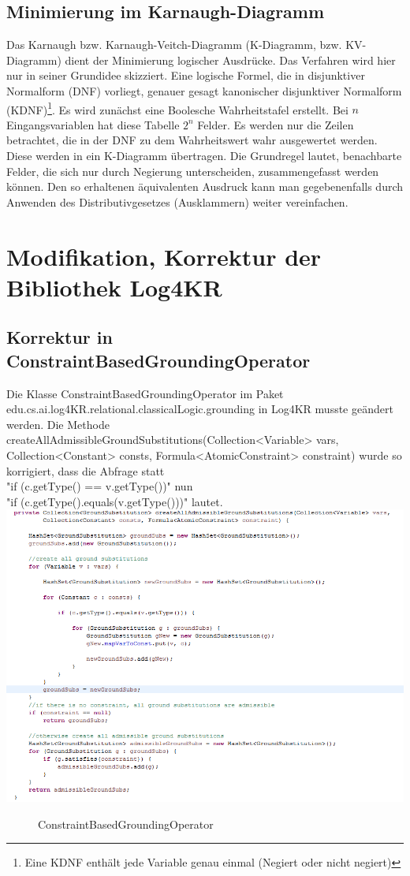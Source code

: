 \documentclass[a4paper, 11pt]{book}
\begin{document}
{	\section{Minimierung im Karnaugh-Diagramm}\label{Min_K_Dia} 
	Das Karnaugh bzw. Karnaugh-Veitch-Diagramm (K-Diagramm, bzw. KV-Diagramm) dient der Minimierung logischer Ausdrücke. Das Verfahren wird hier nur in seiner Grundidee skizziert. Eine logische Formel, die in disjunktiver Normalform (DNF) vorliegt, genauer gesagt kanonischer disjunktiver Normalform (KDNF)\footnote{Eine KDNF enthält jede Variable genau einmal (Negiert oder nicht negiert)}. Es wird zunächst eine Boolesche Wahrheitstafel erstellt. Bei $ n $ Eingangsvariablen hat diese Tabelle $ 2^{n} $ Felder. Es werden nur die Zeilen betrachtet, die in der DNF zu dem Wahrheitswert wahr ausgewertet werden. Diese werden in ein K-Diagramm übertragen.  Die Grundregel lautet, benachbarte Felder, die sich nur durch Negierung unterscheiden, zusammengefasst werden können. Den so erhaltenen äquivalenten Ausdruck kann man gegebenenfalls durch Anwenden des Distributivgesetzes (Ausklammern) weiter vereinfachen.
}
\chapter{Modifikation, Korrektur der Bibliothek Log4KR}
\section{Korrektur in ConstraintBasedGroundingOperator}
\label{sec:Korrektur1}
Die Klasse ConstraintBasedGroundingOperator im Paket edu.cs.ai.log4KR.relational.classicalLogic.grounding in Log4KR musste geändert werden. Die Methode createAllAdmissibleGroundSubstitutions(Collection<Variable> vars,
Collection<Constant> consts, Formula<AtomicConstraint> constraint) wurde so korrigiert, dass die Abfrage statt\\
 "{}if (c.getType() == v.getType())"{} 
nun \\
"{}if (c.getType().equals(v.getType()))"{} lautet.\\
\includegraphics[scale = 1.0]{Graphics/Aenderung_1}
\begin{figure}[h]
	\caption{ConstraintBasedGroundingOperator}
\end{figure}
\end{document}
